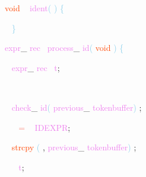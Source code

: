 \documentclass[8, usernames, dvipsnames]{beamer}
\begin{document}
\begin{frame}
\textcolor{OrangeRed}{void}
\textcolor{White}{\ }
\textcolor{Violet}{ident}\textcolor{SkyBlue}{(}
\textcolor{SkyBlue}{)}
\textcolor{SkyBlue}{\{ }

 \textcolor{White}{\   }
\textcolor{SkyBlue}{\} }

 
 \textcolor{Violet}{expr}\textcolor{Sepia}{\_}
\textcolor{Violet}{rec}\textcolor{White}{\ }
\textcolor{Violet}{process}\textcolor{Sepia}{\_}
\textcolor{Violet}{id}\textcolor{SkyBlue}{(}
\textcolor{OrangeRed}{void}
\textcolor{SkyBlue}{)}
\textcolor{SkyBlue}{\{ }

 \textcolor{White}{\   }
\textcolor{Violet}{expr}\textcolor{Sepia}{\_}
\textcolor{Violet}{rec}\textcolor{White}{\ }
\textcolor{Violet}{t}\textcolor{Sepia}{;}

 \textcolor{White}{\   }

 \textcolor{White}{\   }
\textcolor{Violet}{check}\textcolor{Sepia}{\_}
\textcolor{Violet}{id}\textcolor{SkyBlue}{(}
\textcolor{Violet}{previous}\textcolor{Sepia}{\_}
\textcolor{Violet}{tokenbuffer}\textcolor{SkyBlue}{)}
\textcolor{Sepia}{;}

 \textcolor{White}{\   }
\textcolor{White}{\ }
\textcolor{Salmon}{=}
\textcolor{White}{\ }
\textcolor{Violet}{IDEXPR}\textcolor{Sepia}{;}

 \textcolor{White}{\   }
\textcolor{OrangeRed}{strcpy}
\textcolor{SkyBlue}{(}
\textcolor{Sepia}{,}
\textcolor{Violet}{previous}\textcolor{Sepia}{\_}
\textcolor{Violet}{tokenbuffer}\textcolor{SkyBlue}{)}
\textcolor{Sepia}{;}

 \textcolor{White}{\   }
\textcolor{OrangeRed}{	}
\textcolor{White}{\ }
\textcolor{Violet}{t}\textcolor{Sepia}{;}

 \end{frame}
\end{document}
